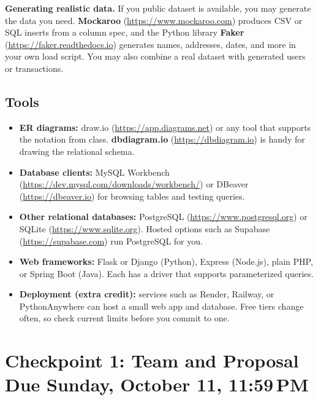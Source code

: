 \documentclass[11pt]{article}
\newcommand{\cponedue}{Sunday, October 11, 11:59\,PM}
\begin{document}
\noindent\textbf{Generating realistic data.} If you public dataset is available, you may generate the data you need. \textbf{Mockaroo} (\url{https://www.mockaroo.com}) produces CSV or SQL inserts from a column spec, and the Python library \textbf{Faker} (\url{https://faker.readthedocs.io}) generates names, addresses, dates, and more in your own load script. You may also combine a real dataset with generated users or transactions.

\subsection*{Tools}
\begin{itemize}
  \item \textbf{ER diagrams:} draw.io (\url{https://app.diagrams.net}) or any tool that supports the notation from class. \textbf{dbdiagram.io} (\url{https://dbdiagram.io}) is handy for drawing the relational schema.
  \item \textbf{Database clients:} MySQL Workbench (\url{https://dev.mysql.com/downloads/workbench/}) or DBeaver (\url{https://dbeaver.io}) for browsing tables and testing queries.
  \item \textbf{Other relational databases:} PostgreSQL (\url{https://www.postgresql.org}) or SQLite (\url{https://www.sqlite.org}). Hosted options such as Supabase (\url{https://supabase.com}) run PostgreSQL for you.
  \item \textbf{Web frameworks:} Flask or Django (Python), Express (Node.js), plain PHP, or Spring Boot (Java). Each has a driver that supports parameterized queries.
  \item \textbf{Deployment (extra credit):} services such as Render, Railway, or PythonAnywhere can host a small web app and database. Free tiers change often, so check current limits before you commit to one.
\end{itemize}

\section{Checkpoint 1: Team and Proposal \hfill {\normalsize Due \cponedue}}
\end{document}

